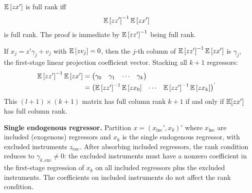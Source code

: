\begin{remark}
	$\mathbb{E}\left[zx'\right]$ is full rank iff \[
		\mathbb{E}\left[zz'\right]^{-1}\mathbb{E}\left[zx'\right]
	\]
	is full rank. The proof is immediate by $\mathbb{E}\left[zz'\right] ^{-1}$ being full rank.

	If $x_j = z'\gamma_j + v_j$ with $\mathbb{E}\left[zv_j\right]=0$, then the $j$-th column of $\mathbb{E}\left[zz'\right]^{-1}\mathbb{E}\left[zx'\right]$ is $\gamma_j$, the first-stage linear projection coefficient vector. Stacking all $k+1$ regressors:
	\[
		\begin{aligned}
			\mathbb{E}\left[zz'\right]^{-1}\mathbb{E}\left[zx'\right]
			&= \begin{pmatrix} \gamma_0 & \gamma_1 & \cdots & \gamma_k \end{pmatrix} \\
			&= \begin{pmatrix}
				\mathbb{E}\left[zz'\right]^{-1} \mathbb{E}\left[zx_0\right] & \cdots & \mathbb{E}\left[zz'\right]^{-1}\mathbb{E}\left[zx_k\right]
			\end{pmatrix}
		\end{aligned}
	.\]
	This $(l+1)\times(k+1)$ matrix has full column rank $k+1$ if and only if $\mathbb{E}[zx']$ has full column rank.

	\textbf{Single endogenous regressor.} Partition $x = (x_{\text{inc}}', x_k)'$ where $x_{\text{inc}}$ are included (exogenous) regressors and $x_k$ is the single endogenous regressor, with excluded instruments $z_{\text{exc}}$. After absorbing included regressors, the rank condition reduces to $\gamma_{k,\text{exc}} \ne 0$: the excluded instruments must have a nonzero coefficient in the first-stage regression of $x_k$ on all included regressors plus the excluded instruments. The coefficients on included instruments do not affect the rank condition.


\end{remark}
